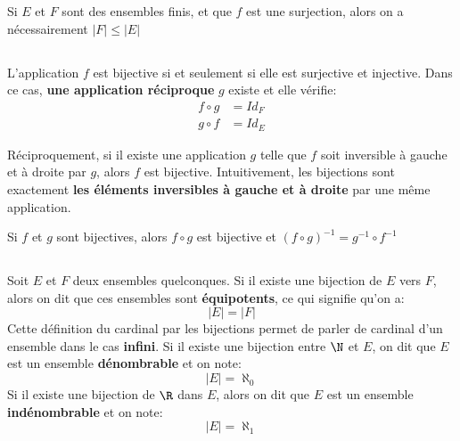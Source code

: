 Si \(E\) et \(F\) sont des ensembles finis, et que \(f\) est une surjection, alors on a nécessairement \(|F| \leq |E|\)
\subsection*{}
L'application \(f\) est bijective si et seulement si elle est surjective et injective.\+  
Dans ce cas, \textbf{une application réciproque} \(g\) existe et elle vérifie:
    \begin{align*}
        f \circ g &= Id_F \\
        g \circ f &= Id_E
    \end{align*}


Réciproquement, si il existe une application \(g\) telle que \(f\) soit inversible à gauche et à droite par \(g\), alors \(f\) est bijective.\+
Intuitivement, les bijections sont exactement \textbf{les éléments inversibles à gauche et à droite} par une même application.\<

Si \(f\) et \(g\) sont bijectives, alors \(f \circ g\) est bijective et \((f \circ g)^{-1} = g^{-1} \circ f^{-1}\)

\subsection*{}
Soit \(E\) et \(F\) deux ensembles quelconques.\+
Si il existe une bijection de \(E\) vers \(F\), alors on dit que ces ensembles sont \textbf{équipotents}, ce qui signifie qu'on a:
\[
    |E| = |F|
\]
Cette définition du cardinal par les bijections permet de parler de cardinal d'un ensemble dans le cas \textbf{infini}.\+
Si il existe une bijection entre \(\N\) et \(E\), on dit que \(E\) est un ensemble \textbf{dénombrable} et on note:
\[
    |E| = \aleph_0
\]
Si il existe une bijection de \(\R\) dans \(E\), alors on dit que \(E\) est un ensemble \textbf{indénombrable} et on note:
\[
    |E| = \aleph_1
\]
